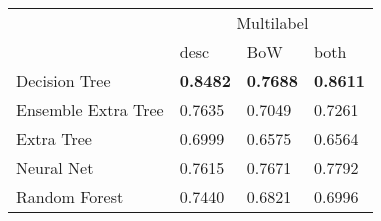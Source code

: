 \begin{tabular}{|l|l|l|l| }
\hline
 &  \multicolumn{3}{c|}{Multilabel} \\
\cline{2-4} & desc & BoW & both \\ \hline
Decision Tree       & {\bf 0.8482} & {\bf 0.7688} & {\bf 0.8611}\\
Ensemble Extra Tree & 0.7635 & 0.7049 & 0.7261\\
Extra Tree          & 0.6999 & 0.6575 & 0.6564\\
Neural Net          & 0.7615 & 0.7671 & 0.7792\\
Random Forest       & 0.7440 & 0.6821 & 0.6996\\
\hline
\end{tabular}